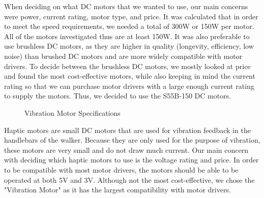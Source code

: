 \noindent When deciding on what DC motors that we wanted to use, our main concerns were power, current rating, motor type, and price. It was calculated that in order to meet the speed requirements, we needed a total of 300W or 150W per motor. All of the motors investigated thus are at least 150W. It was also preferable to use brushless DC motors, as they are higher in quality (longevity, efficiency, low noise) than brushed DC motors and are more widely compatible with motor drivers. To decide between the brushless DC motors, we mostly looked at price and found the most cost-effective motors, while also keeping in mind the current rating so that we can purchase motor drivers with a large enough current rating to supply the motors. Thus, we decided to use the S55B-150 DC motors. \cite{yzl1} \cite{Citphto} \cite{AliExpress1} \cite{AliExpress2} \cite{AliExpress3} \cite{PrecisionMicrodrives} \cite {AliExpress8}\\

\begin{figure}[H]
	\centering
	\setlength{\tabcolsep}{5pt} %
	\renewcommand{\arraystretch}{1.75} %
	\caption{\label{fig:vibrationMotorSpecifications}Vibration Motor Specifications}
\end{figure}

\noindent Haptic motors are small DC motors that are used for vibration feedback in the handlebars of the walker. Because they are only used for the purpose of vibration, these motors are very small and do not draw much current. Our main concern with deciding which haptic motors to use is the voltage rating and price. In order to be compatible with most motor drivers, the motors should be able to be operated at both 5V and 3V. Although not the most cost-effective, we chose the "Vibration Motor" as it has the largest compatibility with motor drivers.\\

